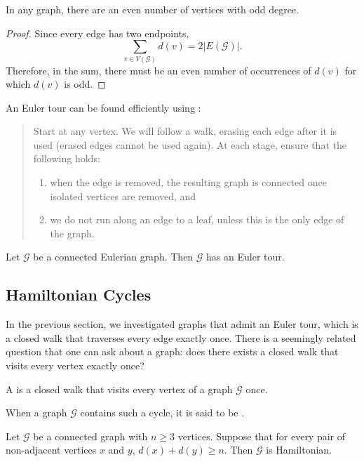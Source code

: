 \begin{lemma}
In any graph, there are an even number of vertices with odd degree.
\end{lemma}

\begin{proof}
Since every edge has two endpoints,
\[\sum_{v\in V(\mathcal{G})}d(v)=2|E(\mathcal{G})|.\]
Therefore, in the sum, there must be an even number of occurrences of $d(v)$ for which $d(v)$ is odd.
\end{proof}

An Euler tour can be found efficiently using :
\begin{quote}
Start at any vertex. We will follow a walk, erasing each edge after it is used (erased edges cannot be used again). At each stage, ensure that the following holds:
\begin{enumerate}[label=(\roman*)]
\item when the edge is removed, the resulting graph is connected once isolated vertices are removed, and
\item we do not run along an edge to a leaf, unless this is the only edge of the graph.
\end{enumerate}
\end{quote}

\begin{theorem}[Euler]
Let $\mathcal{G}$ be a connected Eulerian graph. Then $\mathcal{G}$ has an Euler tour.
\end{theorem}

\subsection{Hamiltonian Cycles}
In the previous section, we investigated graphs that admit an Euler tour, which is a closed walk that traverses every edge exactly once. There is a seemingly related question that one can ask about a graph: does there exists a closed walk that visits every vertex exactly once?

\begin{definition}
A  is a closed walk that visits every vertex of a graph $\mathcal{G}$ once.

When a graph $\mathcal{G}$ contains such a cycle, it is said to be .
\end{definition}

\begin{theorem}
Let $\mathcal{G}$ be a connected graph with $n\ge3$ vertices. Suppose that for every pair of non-adjacent vertices $x$ and $y$, $d(x)+d(y)\ge n$. Then $\mathcal{G}$ is Hamiltonian.
\end{theorem}

